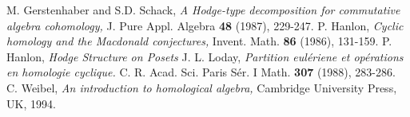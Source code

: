 \documentclass{article}
\begin{document}
\begin{thebibliography}{9}
  M. Gerstenhaber and S.D. Schack,
  \emph{A Hodge-type decomposition for commutative algebra cohomology,}
  J. Pure Appl. Algebra {\bf 48} (1987), 229-247.
  P. Hanlon,
  \emph{Cyclic homology and the Macdonald conjectures,}
  Invent. Math. {\bf 86} (1986), 131-159.
  P. Hanlon,
  \emph{Hodge Structure on Posets}
  J. L. Loday,
  \emph{Partition eul\'eriene et op\'erations en homologie cyclique.}
  C. R. Acad. Sci. Paris S\'er. I Math. {\bf 307} (1988), 283-286.
  C. Weibel,
  \emph{An introduction to homological algebra,}
  Cambridge University Press, UK, 1994.

\end{thebibliography}
\end{document}
